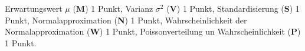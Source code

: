 \begin{bewertung}
Erwartungswert $\mu$ ({\bf M}) 1 Punkt,
Varianz $\sigma^2$ ({\bf V}) 1 Punkt,
Standardisierung ({\bf S}) 1 Punkt,
Normalapproximation ({\bf N}) 1 Punkt,
Wahrscheinlichkeit der Normalapproximation ({\bf W}) 1 Punkt,
Poissonverteilung un Wahrscheinlichkeit ({\bf P}) 1 Punkt.
\end{bewertung}


